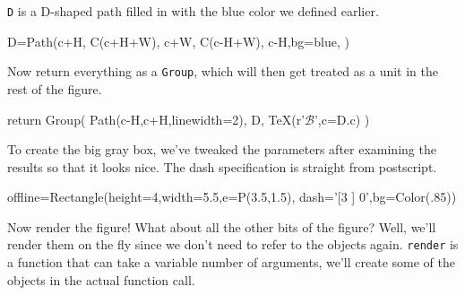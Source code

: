 \documentclass[a4paper]{book}
\begin{document}
\Verb|D| is a D-shaped path filled in with the blue color we defined earlier.
\begin{python}
    D=Path(c+H,
           C(c+H+W),
           c+W,
           C(c-H+W),
           c-H,bg=blue,
           )
\end{python}
Now return everything as a \Verb|Group|, which will then get treated as a unit 
in the rest of the figure.
\begin{python}
    return Group(
        Path(c-H,c+H,linewidth=2),
        D,
        TeX(r'$\mathcal{B}$',c=D.c)
        )
\end{python}
To create the big gray box, we've tweaked the parameters after
examining the results so that it looks nice. The dash specification is
straight from postscript.
\begin{python}
offline=Rectangle(height=4,width=5.5,e=P(3.5,1.5),
                  dash='[3 ] 0',bg=Color(.85))
\end{python}
Now render the figure! What about all the other bits of the figure?
Well, we'll render them on the fly since we don't need to refer to the
objects again. \Verb|render| is a function that can take a variable
number of arguments, we'll create some of the objects in the
actual function call.
\end{document}
